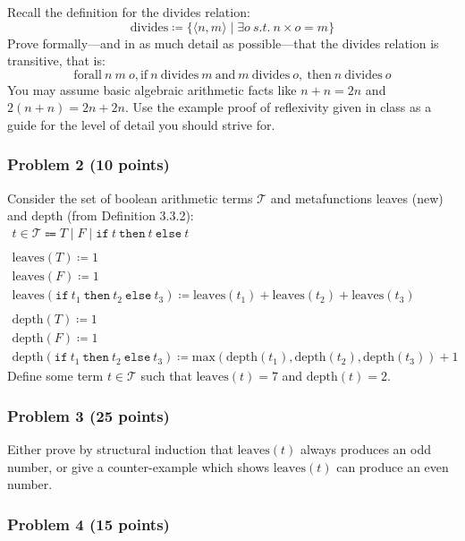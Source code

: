\documentclass{article}
\begin{document}
Recall the definition for the divides relation:
\[ \text{divides} \coloneqq \{ \langle n,m \rangle  \mid \exists o\ \textit{s.t.}\ n \times o = m \} \]
Prove formally---and in as much detail as possible---that the divides relation
is transitive, that is:
\[ \text{forall}\ n\ m\ o, \text{if}\ n\ \text{divides}\ m\ \text{and}\ m\ \text{divides}\ o,\ \text{then}\ n\ \text{divides}\ o \]
You may assume basic algebraic arithmetic facts like $n+n=2n$ and $2(n+n) =
2n+2n$. Use the example proof of reflexivity given in class as a guide for the
level of detail you should strive for.

\subsubsection*{Problem 2 (10 points)}

Consider the set of boolean arithmetic terms $\mathcal{T}$ and metafunctions leaves (new) and depth (from Definition 3.3.2):
\[ \begin{array}{l}
   t \in \mathcal{T} \Coloneqq T \mid F \mid \texttt{if}\ t\ \texttt{then}\ t\ \texttt{else}\ t
   \\
   \\ \text{leaves}(T) \coloneqq 1
   \\ \text{leaves}(F) \coloneqq 1
   \\ \text{leaves}(\texttt{if}\ t_1\ \texttt{then}\ t_2\ \texttt{else}\ t_3) 
      \coloneqq \text{leaves}(t_1) + \text{leaves}(t_2) + \text{leaves}(t_3)
   \\
   \\ \text{depth}(T) \coloneqq 1
   \\ \text{depth}(F) \coloneqq 1
   \\ \text{depth}(\texttt{if}\ t_1\ \texttt{then}\ t_2\ \texttt{else}\ t_3) 
      \coloneqq \text{max}(\text{depth}(t_1),\text{depth}(t_2),\text{depth}(t_3)) + 1
   \end{array}
\]
Define some term $t \in \mathcal{T}$ such that $\text{leaves}(t) = 7$ and $\text{depth}(t) = 2$.

\subsubsection*{Problem 3 (25 points)}

Either prove by structural induction that $\text{leaves}(t)$ always produces an
odd number, or give a counter-example which shows $\text{leaves}(t)$ can produce
an even number.

\subsubsection*{Problem 4 (15 points)}
\end{document}
